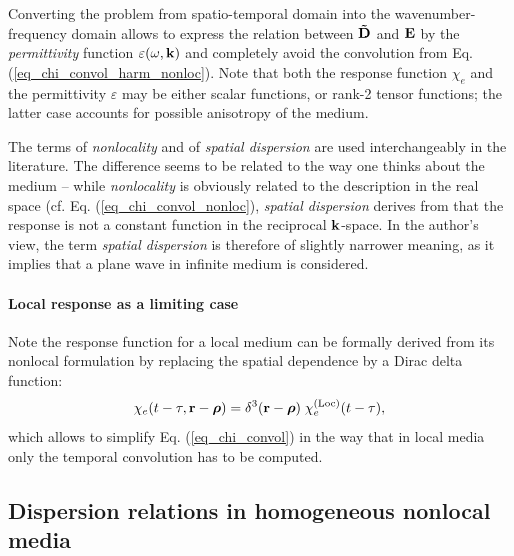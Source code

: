Converting the problem from spatio-temporal domain into the wavenumber-frequency domain allows to express the relation between $\mathbf{\tilde{D}}$ and $\mathbf{E}$ by the \textit{permittivity} function $\varepsilon(\omega, {\mathbf{k}})$ and completely avoid the convolution from Eq. (\ref{eq_chi_convol_harm_nonloc}). Note that both the response function $\chi_e$ and the permittivity $\varepsilon$ %
may be either scalar functions, or rank-2 tensor functions; the latter case accounts for possible anisotropy of the medium.

The terms of \textit{nonlocality} and of \textit{spatial dispersion} are used interchangeably in the literature. The difference seems to be related to the way one thinks about the medium -- while \textit{nonlocality} is obviously related to the description in the real space (cf. Eq. (\ref{eq_chi_convol_nonloc}), \textit{spatial dispersion} derives from that the response is not a constant function in the reciprocal ${\mathbf{k}}$-space. In the author's view, the term \textit{spatial dispersion} is therefore of slightly narrower meaning, as it implies that a plane wave in infinite medium is considered.
\paragraph{Local response as a limiting case} %
Note the response function for a local medium can be formally derived from its nonlocal formulation by replacing the spatial dependence by a Dirac delta function: %
\begin{equation} \chi_e(t-\tau, {\mathbf{r}}-\boldsymbol{\rho}) = \delta^{3}({\mathbf{r}}-\boldsymbol{\rho}) \; \chi_e^{\rm(Loc)}(t-\tau), \label{eq_loc_chi}\end{equation}
which allows to simplify Eq. (\ref{eq_chi_convol}) in the way that in local media only the temporal convolution has to be computed.


\subsection{Dispersion relations in homogeneous nonlocal media} %
